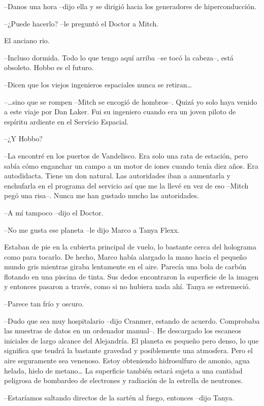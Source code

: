 {--Danos una hora --dijo ella y se dirigió hacia los generadores de
hiperconducción.}

{--¿Puede hacerlo? --le preguntó el Doctor a Mitch.}

{El anciano rio.}

{--Incluso dormida. Todo lo que tengo aquí arriba --se tocó la cabeza--,
está obsoleto. Hobbo es el futuro.}

{--Dicen que los viejos ingenieros espaciales nunca se retiran\ldots{}}

{--\ldots{}sino que se rompen --Mitch se encogió de hombros--. Quizá yo
 solo haya venido a este viaje por Dan Laker. Fui su ingeniero cuando era
un joven piloto de espíritu ardiente en el Servicio Espacial.}

{--¿Y Hobbo?}

{--La encontré en los puertos de Vandelisco. Era solo una rata de
 estación, pero sabía cómo enganchar un campo a un motor de iones cuando
 tenía diez años. Era autodidacta. Tiene un don natural. Las autoridades
 iban a aumentarla y enchufarla en el programa del servicio así que me la
 llevé en vez de eso --Mitch pegó una risa--. Nunca me han gustado mucho
las autoridades.}

{--A mí tampoco --dijo el Doctor.}

{--No me gusta ese
planeta --le dijo Marco a Tanya Flexx.}

{Estaban de pie en la cubierta principal de vuelo, lo bastante cerca del
 holograma como para tocarlo. De hecho, Marco había alargado la mano
 hacia el pequeño mundo gris mientras giraba lentamente en el aire.
 Parecía una bola de carbón flotando en una piscina de tinta. Sus dedos
 encontraron la superficie de la imagen y entonces pasaron a través, como
si no hubiera nada ahí. Tanya se estremeció.}

{--Parece tan frío y oscuro.}

{--Dudo que sea muy hospitalario --dijo Cranmer, estando de acuerdo.
 Comprobaba las muestras de datos en un ordenador manual--. He descargado
 los escaneos iniciales de largo alcance del Alejandría. El planeta es
 pequeño pero denso, lo que significa que tendrá la bastante gravedad y
 posiblemente una atmosfera. Pero el aire seguramente sea venenoso. Estoy
 obteniendo hidrosulfuro de amonio, agua helada, hielo de metano\ldots{}
 La superficie también estará sujeta a una cantidad peligrosa de
bombardeo de electrones y radiación de la estrella de neutrones.}

{--Estaríamos saltando directos de la sartén al fuego, entonces --dijo
Tanya.}

